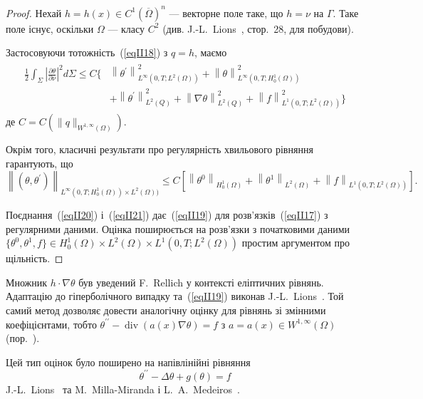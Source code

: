 \begin{proof}
\label{proof:II.theorem.2.1}
Нехай $h = h(x) \in C^1(\overline{\Omega})^n$ — векторне поле таке, що
$
h = \nu \text{ на } \Gamma.
$
Таке поле існує, оскільки $\Omega$ — класу $C^2$ (див. J.-L.~Lions~\cite{lions1988controlabilite}, стор.~28, для побудови).

Застосовуючи тотожність~(\ref{eqII18}) з $q = h$, маємо
\begin{align}\label{eqII20}
\begin{split}
\frac{1}{2} \int_\Sigma \left|\frac{\partial \theta}{\partial \nu} \right|^2 d\Sigma \leq  C \big\{ &\left\| \theta^\prime \right\|_{L^\infty(0, T; L^2(\Omega))}^2 + \left\|\theta \right\|_{L^\infty(0, T; H_0^1(\Omega))}^2
\\ & +  \left\| \theta^\prime \right\|_{L^2(Q)}^2
+  \left\| \nabla \theta \right\|_{L^2(Q)}^2 + \left\| f \right\|_{L^1(0,T; L^2(\Omega))}^2 \big\}
\end{split}
\end{align}
де $C = C(\|q\|_{W^{1,\infty}(\Omega)})$.

Окрім того, класичні результати про регулярність хвильового рівняння гарантують, що
\begin{equation}\label{eqII21}
 \left\|(\theta, \theta^\prime) \right\|_{L^\infty(0, T; H_0^1(\Omega))\times L^2(\Omega))} \leq
C \left[ \left\|\theta^0 \right\|_{H_0^1(\Omega)} +
 \left\|\theta^1 \right\|_{L^2(\Omega)} +
\left\| f \right\|_{L^1(0,T; L^2(\Omega))} \right].
\end{equation}

Поєднання~(\ref{eqII20}) і~(\ref{eqII21}) дає~(\ref{eqII19}) для розв'язків~(\ref{eqII17}) з регулярними даними. Оцінка поширюється на розв'язки з початковими даними $\{\theta^0, \theta^1, f\} \in H_0^1(\Omega) \times L^2(\Omega) \times L^1(0,T; L^2(\Omega))$ простим аргументом про щільність.
\end{proof}

\begin{remark}
\label{remark:II.2.4}
Множник $h \cdot \nabla\theta$ був уведений F.~Rellich у контексті еліптичних рівнянь. Адаптацію до гіперболічного випадку та~(\ref{eqII19}) виконав J.-L.~Lions~\cite{lions1983controle}. Той самий метод дозволяє довести аналогічну оцінку для рівнянь зі змінними коефіцієнтами, тобто
$
\theta^{\prime\prime} - \operatorname{div}(a(x) \nabla \theta) = f
$
з $a = a(x) \in W^{1, \infty}(\Omega)$ (пор.~\cite{lions1983controle}).

Цей тип оцінок було поширено на напівлінійні рівняння
\begin{equation*}
\theta^{\prime\prime} - \Delta \theta + g(\theta) = f
\end{equation*}
J.-L.~Lions~\cite{lions1987hidden} та M.~Milla-Miranda і L.~A.~Medeiros~\cite{milla1988hidden}.
\end{remark}

